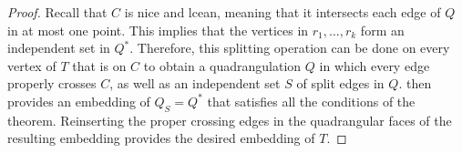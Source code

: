 \documentclass{patmorin}
\begin{document}
\begin{proof}
   Recall that $C$ is nice and lcean, meaning that it intersects each
   edge of $Q$ in at most one point.  This implies that the vertices
   in $r_1,\ldots,r_k$ form an independent set in $Q^*$.  Therefore,
   this splitting operation can be done on every vertex of $T$ that is
   on $C$ to obtain a quadrangulation $Q$ in which every edge properly
   crosses $C$, as well as an independent set $S$ of split edges in $Q$.
    then provides an embedding of $Q_S=Q^*$ that satisfies
   all the conditions of the theorem.  Reinserting the proper crossing
   edges in the quadrangular faces of the resulting embedding provides
   the desired embedding of $T$.
%
%
%
%
%
%

\end{proof}
\end{document}
